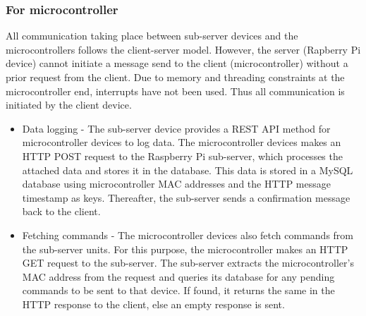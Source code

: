 \documentclass[letterpaper,11pt]{report}
\begin{document}
\subsubsection{For microcontroller}
All communication taking place between sub-server devices and the microcontrollers follows the client-server model. However, the server (Rapberry Pi device) cannot initiate a message send to the client (microcontroller) without a prior request from the client. Due to memory and threading constraints at the microcontroller end, interrupts have not been used. Thus all communication is initiated by the client device. 
\begin{itemize}
    \item Data logging - The sub-server device provides a REST API method for microcontroller devices to log data. The microcontroller devices makes an HTTP POST request to the Raspberry Pi sub-server, which processes the attached data and stores it in the database. This data is stored in a MySQL database using microcontroller MAC addresses and the HTTP message timestamp as keys. Thereafter, the sub-server sends a confirmation message back to the client.
    \item Fetching commands - The microcontroller devices also fetch commands from the sub-server units. For this purpose, the microcontroller makes an HTTP GET request to the sub-server. The sub-server extracts the microcontroller's MAC address from the request and queries its database for any pending commands to be sent to that device. If found, it returns the same in the HTTP response to the client, else an empty response is sent.
\end{itemize}
\end{document}

